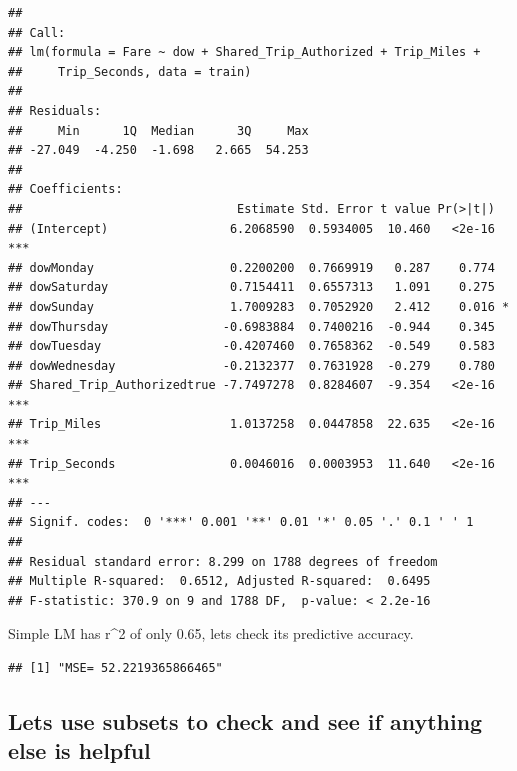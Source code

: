 \documentclass[
]{article}
\newenvironment{Shaded}{\begin{snugshade}}{\end{snugshade}}
\newcommand{\AttributeTok}[1]{\textcolor[rgb]{0.13,0.29,0.53}{#1}}
\newcommand{\DecValTok}[1]{\textcolor[rgb]{0.00,0.00,0.81}{#1}}
\newcommand{\FunctionTok}[1]{\textcolor[rgb]{0.13,0.29,0.53}{\textbf{#1}}}
\newcommand{\NormalTok}[1]{#1}
\newcommand{\OtherTok}[1]{\textcolor[rgb]{0.56,0.35,0.01}{#1}}
\newcommand{\SpecialCharTok}[1]{\textcolor[rgb]{0.81,0.36,0.00}{\textbf{#1}}}
\newcommand{\StringTok}[1]{\textcolor[rgb]{0.31,0.60,0.02}{#1}}
\begin{document}
\begin{verbatim}
## 
## Call:
## lm(formula = Fare ~ dow + Shared_Trip_Authorized + Trip_Miles + 
##     Trip_Seconds, data = train)
## 
## Residuals:
##     Min      1Q  Median      3Q     Max 
## -27.049  -4.250  -1.698   2.665  54.253 
## 
## Coefficients:
##                              Estimate Std. Error t value Pr(>|t|)    
## (Intercept)                 6.2068590  0.5934005  10.460   <2e-16 ***
## dowMonday                   0.2200200  0.7669919   0.287    0.774    
## dowSaturday                 0.7154411  0.6557313   1.091    0.275    
## dowSunday                   1.7009283  0.7052920   2.412    0.016 *  
## dowThursday                -0.6983884  0.7400216  -0.944    0.345    
## dowTuesday                 -0.4207460  0.7658362  -0.549    0.583    
## dowWednesday               -0.2132377  0.7631928  -0.279    0.780    
## Shared_Trip_Authorizedtrue -7.7497278  0.8284607  -9.354   <2e-16 ***
## Trip_Miles                  1.0137258  0.0447858  22.635   <2e-16 ***
## Trip_Seconds                0.0046016  0.0003953  11.640   <2e-16 ***
## ---
## Signif. codes:  0 '***' 0.001 '**' 0.01 '*' 0.05 '.' 0.1 ' ' 1
## 
## Residual standard error: 8.299 on 1788 degrees of freedom
## Multiple R-squared:  0.6512, Adjusted R-squared:  0.6495 
## F-statistic: 370.9 on 9 and 1788 DF,  p-value: < 2.2e-16
\end{verbatim}

Simple LM has r\^{}2 of only 0.65, lets check its predictive accuracy.

\begin{Shaded}
\end{Shaded}

\begin{verbatim}
## [1] "MSE= 52.2219365866465"
\end{verbatim}

\subsection{Lets use subsets to check and see if anything else is
helpful}\label{lets-use-subsets-to-check-and-see-if-anything-else-is-helpful}
\end{document}
